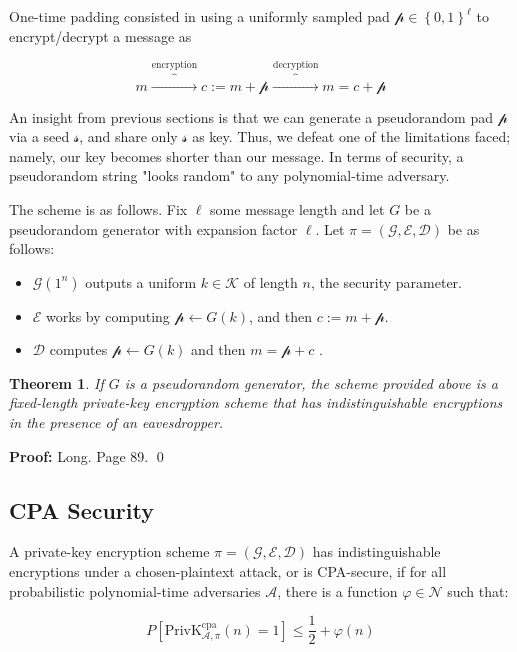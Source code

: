 \documentclass[a4paper, 12pt]{article}
\newtheorem{theorem}{Theorem}
\newtheorem{theorem}{Theorem}
\newenvironment{proof}[1][Proof]{\par\small\noindent\textbf{#1:} }{\qed\par\normalsize}
\begin{document}
One-time padding consisted in using a uniformly sampled 
pad $\mathcal{p} \in \left\{ 0, 1 \right\}^{\ell} $ to encrypt/decrypt 
a message as 

\begin{equation*}
    m \overbrace{\rightarrow }^{\text{encryption}} c := m + \mathcal{p} \overbrace{\rightarrow }^{\text{decryption}} m = c + \mathcal{p}
\end{equation*}

An insight from previous sections is that we can generate 
a pseudorandom pad $\mathcal{p}$ via a seed $\mathcal{s}$,
and share only $\mathcal{s}$ as key. Thus, we defeat one of the 
limitations faced; namely, our key becomes shorter than our message.
In terms of security, a pseudorandom string "looks random" to any 
polynomial-time adversary.

The scheme is as follows. Fix $\ell$ some message length and let 
$G$ be a pseudorandom generator with expansion factor $\ell$.
Let $\pi = (\mathcal{G}, \mathcal{E}, \mathcal{D})$
be as follows:

\begin{itemize}
    \item $\mathcal{G}(1^n)$ outputs a uniform $k \in \mathcal{K}$ 
        of length $n$, the security parameter. 
    \item $\mathcal{E}$ works by computing $\mathcal{p} \leftarrow G(k)$,
        and then $c := m + \mathcal{p}$.
    \item $\mathcal{D}$ computes $\mathcal{p} \leftarrow G(k)$
        and then $m = \mathcal{p} + c$ .
\end{itemize}

\begin{theorem}
    If $G$ is a pseudorandom generator, the scheme provided above 
    is a fixed-length private-key encryption scheme that has 
    indistinguishable encryptions in the presence of an eavesdropper.
\end{theorem}

\begin{proof}
    Long. Page 89.
\end{proof}

\subsection{CPA Security}

\begin{definition}
    A private-key encryption scheme $\pi = (\mathcal{G}, \mathcal{E}, \mathcal{D})$ has indistinguishable encryptions under a chosen-plaintext attack, or is CPA-secure, if for all probabilistic polynomial-time adversaries $\mathcal{A}$, there is a function $\varphi \in \mathcal{N}$ such that: 

    \begin{equation*}
        P \left[ \text{PrivK}_{\mathcal{A}, \pi}^{\text{cpa}}(n) = 1 \right]  \leq \frac{1}{2} + \varphi(n)
    \end{equation*}
\end{definition}
\end{document}
